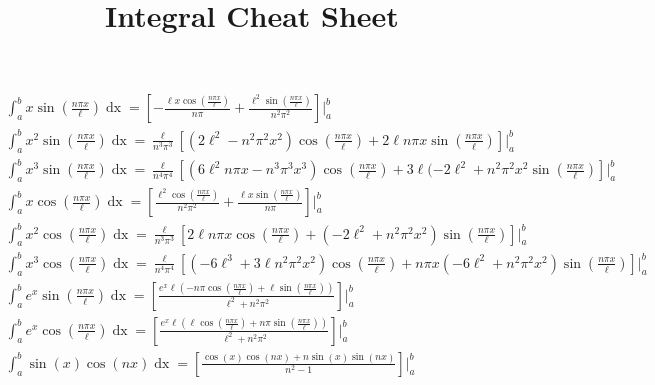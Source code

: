 \documentclass[fleqn]{article}
\title{Integral Cheat Sheet}
\date{}
\begin{document}
\maketitle
\begin{gather*}
\int_{a}^{b}x\sin{\left(\frac{n\pi x}{\ell}\right)}\mathop{dx} = \left[-\frac{\ell x \cos{\left( \frac{n \pi x}{\ell}\right)}}{n\pi} + \frac{\ell^{2}\sin{\left( \frac{n \pi x}{\ell}\right)}}{n^{2}\pi^{2}}\right]\Bigg|_{a}^{b}\\
%
\int_{a}^{b}x^{2}\sin{\left(\frac{n\pi x}{\ell}\right)}\mathop{dx} = \frac{\ell}{n^{3}\pi^{3}}\left[(2\ell^{2}-n^{2}\pi^{2}x^{2})\cos{\left(\frac{n\pi x}{\ell}\right)} + 2\ell n\pi x\sin{\left(\frac{n\pi x}{\ell}\right)}\right]\Bigg|_{a}^{b}\\
%
\int_{a}^{b}x^{3}\sin{\left(\frac{n\pi x}{\ell}\right)}\mathop{dx} = \frac{\ell}{n^{4}\pi^{4}}\left[(6\ell^{2}n\pi x - n^{3}\pi^{3}x^{3})\cos{\left(\frac{n\pi x}{\ell}\right)}  +3\ell(-2\ell^{2} + n^{2}\pi^{2}x^{2}\sin{\left(\frac{n\pi x}{\ell}\right)}\right]\Bigg|_{a}^{b}\\
%
\int_{a}^{b}x\cos{\left(\frac{n\pi x}{\ell}\right)}\mathop{dx} = \left[\frac{\ell^{2}\cos{\left(\frac{n\pi x}{\ell}\right)}}{n^{2}\pi^{2}} + \frac{\ell x \sin{\left(\frac{n\pi x}{\ell}\right)}}{n\pi}\right]\Bigg|_{a}^{b}\\
%
\int_{a}^{b}x^{2}\cos{\left(\frac{n\pi x}{\ell}\right)}\mathop{dx} = \frac{\ell}{n^{3}\pi^{3}}\left[2\ell n\pi x\cos{\left(\frac{n\pi x}{\ell}\right)} + \left(-2\ell^{2}+ n^{2}\pi^{2}x^{2}\right)\sin{\left(\frac{n\pi x}{\ell}\right)}\right]\Bigg|_{a}^{b}\\
%
\int_{a}^{b}x^{3}\cos{\left(\frac{n\pi x}{\ell}\right)}\mathop{dx} = \frac{\ell}{n^{4}\pi^{4}}\left[(-6\ell^{3} + 3\ell n^{2}\pi^{2}x^{2})\cos{\left(\frac{n\pi x}{\ell}\right)} + n\pi x(-6\ell^{2} + n^{2}\pi^{2}x^{2})\sin{\left(\frac{n\pi x}{\ell}\right)}\right]\Bigg|_{a}^{b}\\
%
\int_{a}^{b}e^{x}\sin{\left(\frac{n\pi x}{\ell}\right)}\mathop{dx} = \left[\frac{e^{x}\ell\left(-n\pi\cos{\left(\frac{n\pi x}{\ell}\right)} + \ell\sin{\left(\frac{n\pi x}{\ell}\right)}\right)}{\ell^{2}+ n^{2}\pi^{2}}\right]\Bigg|_{a}^{b}\\
%
\int_{a}^{b}e^{x}\cos{\left(\frac{n\pi x}{\ell}\right)}\mathop{dx} = \left[\frac{e^{x}\ell\left(\ell\cos{\left(\frac{n\pi x}{\ell}\right)} + n\pi\sin{\left(\frac{n\pi x}{\ell}\right)}\right)}{\ell^{2}+ n^{2}\pi^{2}}\right]\Bigg|_{a}^{b}\\
%
\int_{a}^{b}\sin{(x)}\cos{(nx)}\mathop{dx} = \left[\frac{\cos{(x)}\cos{(nx)} + n\sin{(x)}\sin{(nx)}}{n^{2} - 1}\right]\Bigg|_{a}^{b}\\

\end{gather*}
\end{document}
